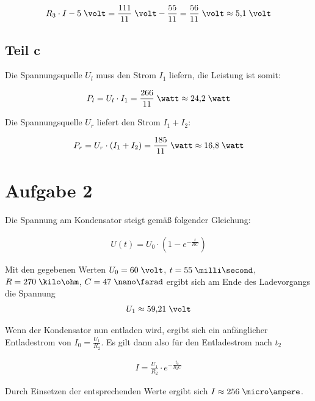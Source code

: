 \documentclass[a4paper,german,12pt,smallheadings]{scrartcl}
\begin{document}
\begin{align*}
  R_3 \cdot I - 5\;\volt = \frac{111}{11}\;\volt - \frac{55}{11} = \frac{56}{11}\;\volt \approx 5{,}1\;\volt
\end{align*}

\subsection*{Teil c}
Die Spannungsquelle $U_l$ muss den Strom $I_1$ liefern, die Leistung ist somit:

\begin{align*}
  P_l = U_l \cdot I_1 = \frac{266}{11} \;\watt \approx 24{,}2\;\watt
\end{align*}

Die Spannungsquelle $U_r$ liefert den Strom $I_1 + I_2$:

\begin{align*}
  P_r = U_r \cdot (I_1 + I_2) = \frac{185}{11} \;\watt \approx 16{,}8\;\watt
\end{align*}

\section*{Aufgabe 2}
Die Spannung am Kondensator steigt gemäß folgender Gleichung:

\begin{align*}
  U(t) = U_0 \cdot (1 - e^{-\frac{t}{RC}})
\end{align*}

Mit den gegebenen Werten $U_0 = 60\;\volt$, $t = 55\;\milli\second$, $R = 270\;\kilo\ohm$, $C = 47\;\nano\farad$ ergibt sich am Ende des Ladevorgangs die Spannung
\begin{align*}
  U_1 \approx 59{,}21 \;\volt
\end{align*}

Wenn der Kondensator nun entladen wird, ergibt sich ein anfänglicher
Entladestrom von $I_0 = \frac{U_1}{R_2}$. Es gilt dann also für den
Entladestrom nach $t_2$

\begin{align*}
  I = \frac{U_1}{R_2} \cdot e^{-\frac{t_2}{R_2C}}
\end{align*}

Durch Einsetzen der entsprechenden Werte ergibt sich $I \approx 256\;\micro\ampere$.
\end{document}
